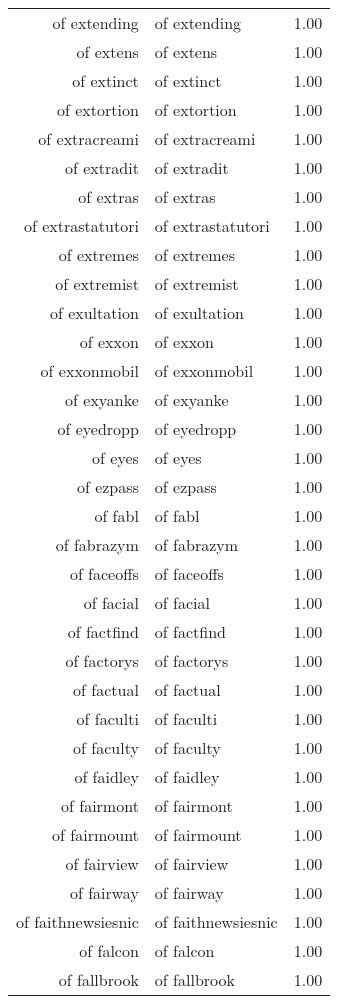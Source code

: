 \begin{table}[ht]
\begin{tabular}{rlr}
  of extending & of extending & 1.00 \\ 
  of extens & of extens & 1.00 \\ 
  of extinct & of extinct & 1.00 \\ 
  of extortion & of extortion & 1.00 \\ 
  of extracreami & of extracreami & 1.00 \\ 
  of extradit & of extradit & 1.00 \\ 
  of extras & of extras & 1.00 \\ 
  of extrastatutori & of extrastatutori & 1.00 \\ 
  of extremes & of extremes & 1.00 \\ 
  of extremist & of extremist & 1.00 \\ 
  of exultation & of exultation & 1.00 \\ 
  of exxon & of exxon & 1.00 \\ 
  of exxonmobil & of exxonmobil & 1.00 \\ 
  of exyanke & of exyanke & 1.00 \\ 
  of eyedropp & of eyedropp & 1.00 \\ 
  of eyes & of eyes & 1.00 \\ 
  of ezpass & of ezpass & 1.00 \\ 
  of fabl & of fabl & 1.00 \\ 
  of fabrazym & of fabrazym & 1.00 \\ 
  of faceoffs & of faceoffs & 1.00 \\ 
  of facial & of facial & 1.00 \\ 
  of factfind & of factfind & 1.00 \\ 
  of factorys & of factorys & 1.00 \\ 
  of factual & of factual & 1.00 \\ 
  of faculti & of faculti & 1.00 \\ 
  of faculty & of faculty & 1.00 \\ 
  of faidley & of faidley & 1.00 \\ 
  of fairmont & of fairmont & 1.00 \\ 
  of fairmount & of fairmount & 1.00 \\ 
  of fairview & of fairview & 1.00 \\ 
  of fairway & of fairway & 1.00 \\ 
  of faithnewsiesnic & of faithnewsiesnic & 1.00 \\ 
  of falcon & of falcon & 1.00 \\ 
  of fallbrook & of fallbrook & 1.00 \\ 

\end{tabular}
\end{table}
